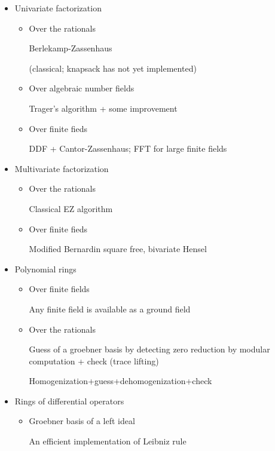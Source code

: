 \begin{slide}{}
\begin{itemize}
\item Univariate factorization

\begin{itemize}
\item Over the rationals

Berlekamp-Zassenhaus

(classical; knapsack has not yet implemented)

\item Over algebraic number fields

Trager's algorithm + some improvement

\item Over finite fieds

DDF + Cantor-Zassenhaus; FFT for large finite fields
\end{itemize}

\item Multivariate factorization

\begin{itemize}
\item Over the rationals

Classical EZ algorithm

\item Over finite fieds

Modified Bernardin square free, bivariate Hensel
\end{itemize}

\end{itemize}
\end{slide}

\begin{slide}{}
\begin{itemize}
\item Polynomial rings
\begin{itemize}
\item Over finite fields

Any finite field is available as a ground field

\item Over the rationals

Guess of a groebner basis by detecting zero reduction by modular computation
+ check (trace lifting)

Homogenization+guess+dehomogenization+check
\end{itemize}

\item Rings of differential operators

\begin{itemize}
\item Groebner basis of a left ideal

An efficient implementation of Leibniz rule
\end{itemize}

\end{itemize}
\end{slide}

